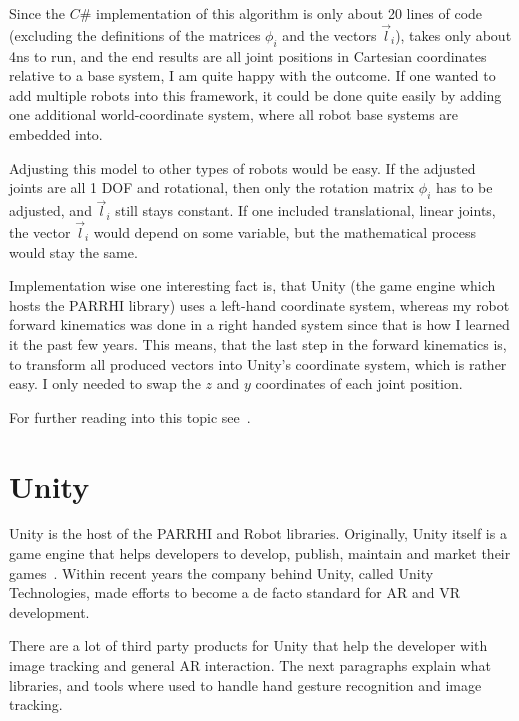 \FloatBarrier

Since the $C\#$ implementation of this algorithm is only about 20 lines of code (excluding the definitions of the matrices $\phi_i$ and the vectors $\vec{l}_i$), takes only about 4ns to run, and the end results are all joint positions in Cartesian coordinates relative to a base system, I am quite happy with the outcome. If one wanted to add multiple robots into this framework, it could be done quite easily by adding one additional world-coordinate system, where all robot base systems are embedded into.
	
Adjusting this model to other types of robots would be easy. If the adjusted joints are all 1 DOF and rotational, then only the rotation matrix $\phi_i$ has to be adjusted, and $\vec{l}_i$ still stays constant. If one included translational, linear joints, the vector $\vec{l}_i$ would depend on some variable, but the mathematical process would stay the same.

Implementation wise one interesting fact is, that Unity (the game engine which hosts the PARRHI library) uses a left-hand coordinate system, whereas my robot forward kinematics was done in a right handed system since that is how I learned it the past few years. This means, that the last step in the forward kinematics is, to transform all produced vectors into Unity's coordinate system, which is rather easy. I only needed to swap the $z$ and $y$ coordinates of each joint position.

For further reading into this topic see~\cite{murray2017mathematical}.
	
\section{Unity}
Unity is the host of the PARRHI and Robot libraries. Originally, Unity itself is a game engine that helps developers to develop, publish, maintain and market their games~\cite{Unity}. Within recent years the company behind Unity, called Unity Technologies, made efforts to become a de facto standard for AR and VR development.

There are a lot of third party products for Unity that help the developer with image tracking and general AR interaction. The next paragraphs explain what libraries, and tools where used to handle hand gesture recognition and image tracking.



